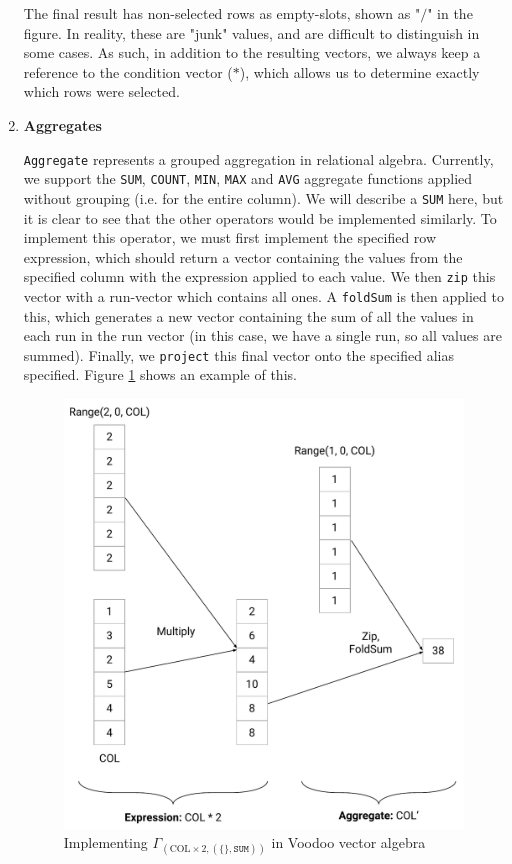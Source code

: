 \begin{enumerate}
    The final result has non-selected rows as empty-slots, shown as "$/$" in the figure. In reality, these are "junk" values, and are difficult to distinguish in some cases. As such, in addition to the resulting vectors, we always keep a reference to the condition vector ($*$), which allows us to determine exactly which rows were selected.
    
    \item \textbf{Aggregates}
    
    \texttt{Aggregate} represents a grouped aggregation in relational algebra. Currently, we support the \texttt{SUM}, \texttt{COUNT}, \texttt{MIN}, \texttt{MAX} and \texttt{AVG} aggregate functions applied without grouping (i.e. for the entire column). We will describe a \texttt{SUM} here, but it is clear to see that the other operators would be implemented similarly. To implement this operator, we must first implement the specified row expression, which should return a vector containing the values from the specified column with the expression applied to each value. We then \texttt{zip} this vector with a run-vector which contains all ones. A \texttt{foldSum} is then applied to this, which generates a new vector containing the sum of all the values in each run in the run vector (in this case, we have a single run, so all values are summed). Finally, we \texttt{project} this final vector onto the specified alias specified. Figure \ref{fig:aggregate} shows an example of this.
    
    \begin{figure}[H]
        \centering
        \includegraphics[width=0.5\linewidth]{appendix/aggregate.pdf}
        \caption{Implementing $\Gamma_{(\text{COL} \times 2, (\{\}, \texttt{SUM}))}$ in Voodoo vector algebra}
        \label{fig:aggregate}
    \end{figure}
    

\end{enumerate}
